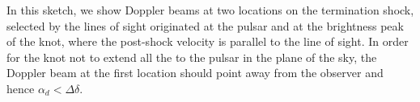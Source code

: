 \label{knot-separation}  {In this sketch, we show Doppler beams at two locations on the termination shock, selected by the lines of sight originated at the pulsar and  at the brightness peak of the knot, where the post-shock velocity is parallel to the line of sight.  
In order for the knot not to extend all the to the pulsar in the plane of the sky,  the Doppler beam at the first location should point away from the observer and hence $\alpha_d < \Delta\delta$.  
}
